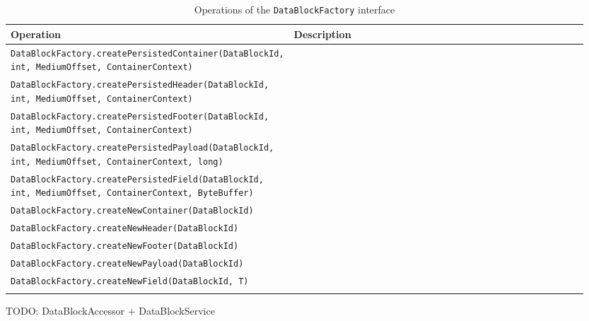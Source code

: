 \small
\begin{landscape}
\begin{longtable}{|p{0.3\linewidth}|p{0.65\linewidth}|}
\hline
\rowcolor[gray]{.9}\textbf{Operation} & \textbf{Description} \\
\endhead
\hline
\texttt{DataBlockFactory.}\texttt{createPersistedContainer(DataBlockId, int, MediumOffset, ContainerContext)} &  \\
\hline
\texttt{DataBlockFactory.}\texttt{createPersistedHeader(DataBlockId, int, MediumOffset, ContainerContext)} &  \\
\hline
\texttt{DataBlockFactory.}\texttt{createPersistedFooter(DataBlockId, int, MediumOffset, ContainerContext)} &  \\
\hline
\texttt{DataBlockFactory.}\texttt{createPersistedPayload(DataBlockId, int, MediumOffset, ContainerContext, long)} &  \\
\hline
\texttt{DataBlockFactory.}\texttt{createPersistedField(DataBlockId, int, MediumOffset, ContainerContext, ByteBuffer)} &  \\
\hline
\texttt{DataBlockFactory.}\texttt{createNewContainer(DataBlockId)} &  \\
\hline
\texttt{DataBlockFactory.}\texttt{createNewHeader(DataBlockId)} &  \\
\hline
\texttt{DataBlockFactory.}\texttt{createNewFooter(DataBlockId)} &  \\
\hline
\texttt{DataBlockFactory.}\texttt{createNewPayload(DataBlockId)} &  \\
\hline
\texttt{DataBlockFactory.}\texttt{createNewField(DataBlockId, T)} &  \\
\hline
\caption{Operations of the \texttt{DataBlockFactory} interface}
\label{tab:DBOpsDataBlockFactory}
\end{longtable}
\end{landscape}
\normalsize

TODO: DataBlockAccessor + DataBlockService

%
%
